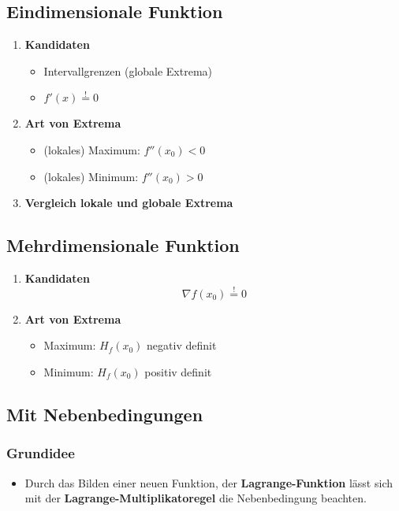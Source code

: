 \documentclass[a3paper, 11pt, landscape]{scrartcl}
\begin{document}
\begin{multicols*}{3}
				\subsection{Eindimensionale Funktion}
					\begin{enumerate}
						\item \textbf{Kandidaten}
							\begin{itemize}
								\item Intervallgrenzen (globale Extrema)
								\item $f'(x) \overset{!}{=}0$
							\end{itemize}
						\item \textbf{Art von Extrema}
							\begin{itemize}
								\item (lokales) Maximum: $f''(x_0)<0$
								\item (lokales) Minimum: $f''(x_0)>0$
							\end{itemize}
						\item \textbf{Vergleich lokale und globale Extrema}
					\end{enumerate}
				\subsection{Mehrdimensionale Funktion}
					\begin{enumerate}
						\item \textbf{Kandidaten}
						\begin{equation*}
							\nabla f(x_0)\overset{!}{=}0
						\end{equation*}
						\item \textbf{Art von Extrema}
							\begin{itemize}
								\item Maximum: $H_f(x_0)$ negativ definit
								\item Minimum: $H_f(x_0)$ positiv definit
							\end{itemize}
					
					\end{enumerate}
		\subsection{Mit Nebenbedingungen}
		
		\subsubsection{Grundidee}
		    \begin{itemize}
		        \item Durch das Bilden einer neuen Funktion, der \textbf{Lagrange-Funktion} lässt sich mit der \textbf{Lagrange-Multiplikatoregel} die Nebenbedingung beachten.
		    \end{itemize}
	    

\end{multicols*}
\end{document}
